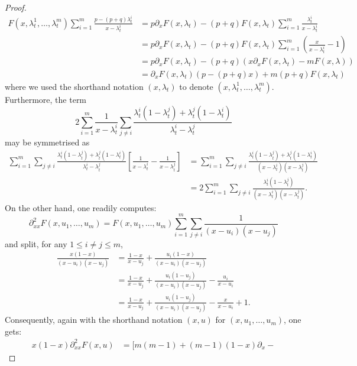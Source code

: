 \documentclass[10pt,a4paper]{amsart}
\begin{document}
\begin{proof}
	\begin{align*}
		F(x, \lambda_t^1, \dots, \lambda_t^m) \sum_{i=1}^m\frac{p-(p+q)\lambda_t^i}{x-\lambda_t^i}
		 & = p\partial_x F(x,\lambda_t) - (p+q)F(x,\lambda_t)\sum_{i=1}^m \frac{\lambda^i_t}{x-\lambda_t^i} \\
		 & = p\partial_x F(x,\lambda_t) - (p+q)F(x,\lambda_t)\sum_{i=1}^m (\frac{x}{x-\lambda^i_{t}}-1)     \\
		 & = p\partial_x F(x,\lambda_t) - (p+q)(x\partial_x F(x,\lambda_t)-mF(x,\lambda))                   \\
		 & = \partial_x  F(x,\lambda_t)(p - (p+q)x)+m(p+q)F(x,\lambda_t)
	\end{align*}
	where we used the shorthand notation $(x,\lambda_t)$ to denote $(x,\lambda_t^1, \dots, \lambda_t^m)$.
	Furthermore, the term
	\begin{equation*}
		2\sum_{i=1}^m\frac{1}{x-\lambda_t^i} \sum_{j\neq i}\frac{\lambda_t^i(1-\lambda_t^j) + \lambda_t^j(1-\lambda_t^i)}{\lambda_t^i-\lambda_t^j}
	\end{equation*}
	may be symmetrised as
	\begin{align*}
		\sum_{i=1}^m\sum_{j\neq i} \frac{\lambda_t^i(1-\lambda_t^j) + \lambda_t^j(1-\lambda_t^i)}{\lambda_t^i-\lambda_t^j}\left[\frac{1}{x-\lambda_t^i} - \frac{1}{x-\lambda_t^j}\right]
		 & =\sum_{i=1}^m\sum_{j\neq i}\frac{\lambda_t^i(1-\lambda_t^j) + \lambda_t^j(1-\lambda_t^i)}{(x-\lambda_t^i)(x-\lambda_t^j)}
		\\& = 2 \sum_{i=1}^m\sum_{j\neq i}\frac{\lambda_t^i(1-\lambda_t^j)}{(x-\lambda_t^i)(x-\lambda_t^j)}.
	\end{align*}
	On the other hand, one readily computes:
	\begin{equation*}
		\partial_{xx}^2F(x, u_1, \dots, u_m) = F(x, u_1, \dots, u_m)\sum_{i=1}^m\sum_{j \neq i}\frac{1}{(x-u_i)(x-u_j)}
	\end{equation*}
	and split, for any $1 \leq i \neq j \leq m$,
	\begin{align*}
		\frac{x(1-x)}{(x-u_i)(x-u_j)} & = \frac{1-x}{x-u_j} + \frac{u_i(1-x)}{(x-u_i)(x-u_j)}
		\\& = \frac{1-x}{x-u_j} + \frac{u_i(1-u_j)}{(x-u_i)(x-u_j)} - \frac{u_i}{x-u_i}
		\\& = \frac{1-x}{x-u_j} + \frac{u_i(1-u_j)}{(x-u_i)(x-u_j)} - \frac{x}{x-u_i} + 1.
	\end{align*}
	Consequently, again with the shorthand notation $(x,u)$ for $(x,u_1, \dots, u_m)$, one gets:
	\begin{align*}
		x(1-x)\partial_{xx}^2F(x, u) & = [m(m-1) + (m-1)(1-x)\partial_x -

\end{align*}
\end{proof}
\end{document}
